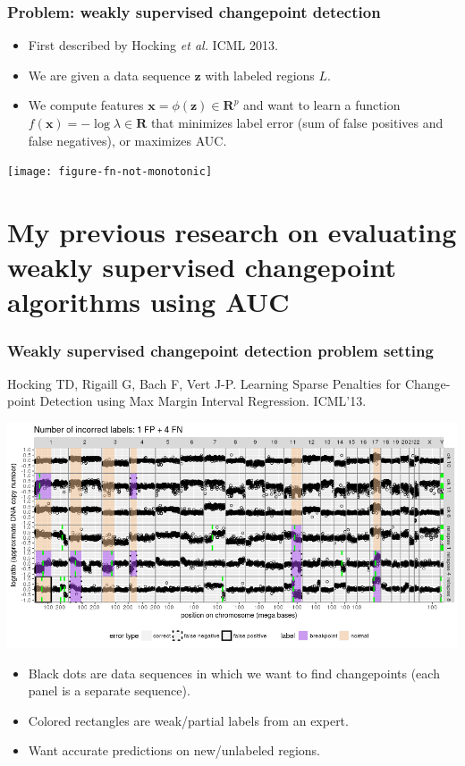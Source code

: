 \documentclass[t]{beamer}
\begin{document}
\begin{frame}
  \frametitle{Problem: weakly supervised changepoint detection}
  \begin{itemize}
  \item First described by Hocking \emph{et al.} ICML 2013.
  \item We are given a data sequence $\mathbf z$ with labeled regions
    $L$.
  \item We compute features $\mathbf x=\phi(\mathbf z)\in\mathbf R^p$
    and want to learn a function $f(\mathbf x)=-\log\lambda\in\mathbf R$ that minimizes label error (sum of false positives and false negatives), or maximizes AUC.
  \end{itemize}

  \texttt{[image: figure-fn-not-monotonic]}

\end{frame}

\section{My previous research on evaluating weakly supervised changepoint algorithms using AUC}

\begin{frame}
  \frametitle{Weakly supervised changepoint detection problem setting}

  {\scriptsize Hocking TD, Rigaill G, Bach F, Vert J-P. Learning Sparse Penalties
  for Change-point Detection using Max Margin Interval
  Regression. ICML'13.}

  \includegraphics[width=\textwidth]{neuroblastoma-ok-relapse-supervised}

  \begin{itemize}
  \item Black dots are data sequences in which we want to find
    changepoints (each panel is a separate sequence).
  \item Colored rectangles are weak/partial labels from an expert.
  \item Want accurate predictions on new/unlabeled regions.
  \end{itemize}
\end{frame}
\end{document}

